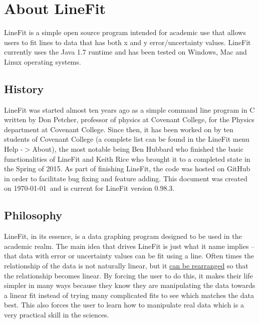 \documentclass[titlepage,12pt]{article}
\begin{document}
\tableofcontents
\newpage


\section{About LineFit}

LineFit is a simple open source program intended for academic use that allows users to fit lines to data that has both x and y error/uncertainty values. LineFit currently uses the Java 1.7 runtime and has been tested on Windows, Mac and Linux operating systems.

\subsection{History}
LineFit was started almost ten years ago as a simple command line program in C written by Don Petcher, professor of physics at Covenant College, for the Physics department at Covenant College. Since then, it has been worked on by ten students of Covenant College (a complete list can be found in the LineFit menu Help -$>$About), the most notable being Ben Hubbard who finished the basic functionalities of LineFit and Keith Rice who brought it to a completed state in the Spring of 2015. As part of finishing LineFit, the code was hosted on GitHub in order to facilitate bug fixing and feature adding. This document was created on \today ~and is current for LineFit version 0.98.3.



\subsection{Philosophy}
LineFit, in its essence, is a data graphing program designed to be used in the academic realm. The main idea that drives LineFit is just what it name implies – that data with error or uncertainty values can be fit using a line. Often times the relationship of the data is not naturally linear, but it \hyperref[sec:dataManipulation]{can be rearranged} so that the relationship becomes linear. By forcing the user to do this, it makes their life simpler in many ways because they know they are manipulating the data towards a linear fit instead of trying many complicated fits to see which matches the data best. This also forces the user to learn how to manipulate real data which is a very practical skill in the sciences.
\end{document}
